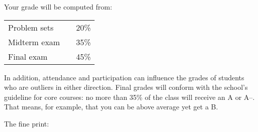 \documentclass[12pt]{article}
\begin{document}
Your grade will be computed from:
%
\begin{center}
\begin{tabular}{lcc}
    Problem sets   &&  20\% \\
    Midterm exam   &&  35\% \\
    Final exam     &&  45\%
\end{tabular}
\end{center}
%
In addition, attendance and participation can influence
the grades of students who are outliers in either direction.
Final grades will conform with the school's guideline for core courses:
no more than 35\% of the class will receive an A or A--.
That means, for example, that you can be above average yet get a B.

The fine print:
\end{document}
